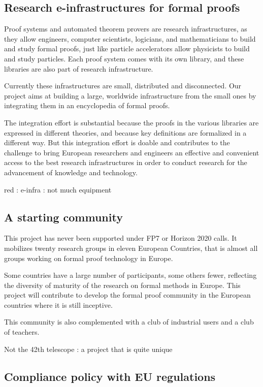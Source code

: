 \subsection{Research e-infrastructures for formal proofs}

Proof systems and automated theorem provers are research
infrastructures, as they allow engineers, computer scientists,
logicians, and mathematicians to build and study formal proofs, just
like particle accelerators allow physicists to build and study
particles. Each proof system comes with its own library, and these
libraries are also part of research infrastructure.

Currently these infrastructures are small, distributed and
disconnected.  Our project aims at building a large, worldwide
infrastructure from the small ones by integrating them in an
encyclopedia of formal proofs.

The integration effort is substantial because the proofs in the
various libraries are expressed in different theories, and because key
definitions are formalized in a different way.  But this integration
effort is doable and contributes to the challenge to bring European
researchers and engineers an effective and convenient access to the
best research infrastructures in order to conduct research for the
advancement of knowledge and technology.

{\color{red}  red : e-infra : not much equipment}

\subsection{A starting community}

This project has never been supported under FP7 or Horizon 2020 calls.
It mobilizes twenty research groups in eleven European Countries, that is
almost all groups working on formal proof technology in Europe.

Some countries have a large number of participants, some others fewer,
reflecting the diversity of maturity of the research on formal methods
in Europe. This project will contribute to develop the formal proof
community in the European countries where it is still inceptive.

This community is also complemented with a club of industrial users and
a club of teachers. 

{\color{red} Not the 42th telescope : a project that is quite unique}

\subsection{Compliance policy with EU regulations}

